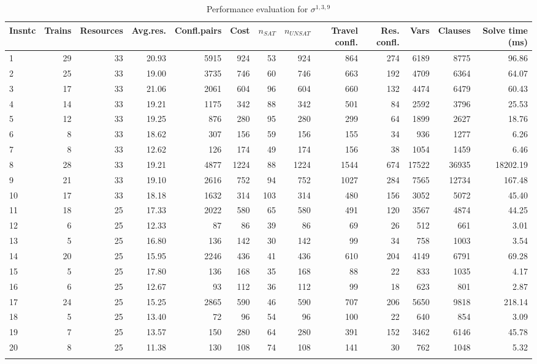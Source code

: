      \begin{landscape}
      \begin{longtable}[]{@{}lrrrrrrrrrrrr@{}}
      Insntc & Trains & Resources & Avg.res. & Confl.pairs & Cost & $n_{SAT}$ & $n_{UNSAT}$ & Travel confl. & Res. confl. & Vars & Clauses & Solve time (ms) \tabularnewline
      \midrule
      \endhead
      1&29&33&20.93&5915&924&53&924&864&274&6189&8775&96.86 \\
      2&25&33&19.00&3735&746&60&746&663&192&4709&6364&64.07 \\
      3&17&33&21.06&2061&604&96&604&660&132&4474&6479&60.43 \\
      4&14&33&19.21&1175&342&88&342&501&84&2592&3796&25.53 \\
      5&12&33&19.25&876&280&95&280&299&64&1899&2627&18.76 \\
      6&8&33&18.62&307&156&59&156&155&34&936&1277&6.26 \\
      7&8&33&12.62&126&174&49&174&156&38&1054&1459&6.46 \\
      8&28&33&19.21&4877&1224&88&1224&1544&674&17522&36935&18202.19 \\
      9&21&33&19.10&2616&752&94&752&1027&284&7565&12734&167.48 \\
      10&17&33&18.18&1632&314&103&314&480&156&3052&5072&45.40 \\
      11&18&25&17.33&2022&580&65&580&491&120&3567&4874&44.25 \\
      12&6&25&12.33&87&86&39&86&69&26&512&661&3.01 \\
      13&5&25&16.80&136&142&30&142&99&34&758&1003&3.54 \\
      14&20&25&15.95&2246&436&41&436&610&204&4149&6791&69.28 \\
      15&5&25&17.80&136&168&35&168&88&22&833&1035&4.17 \\
      16&6&25&12.67&93&112&36&112&99&18&623&801&2.87 \\
      17&24&25&15.25&2865&590&46&590&707&206&5650&9818&218.14 \\
      18&5&25&13.40&72&96&54&96&100&22&640&854&3.09 \\
      19&7&25&13.57&150&280&64&280&391&152&3462&6146&45.78 \\
      20&8&25&11.38&130&108&74&108&141&30&762&1048&5.32 \\
      \caption{Performance evaluation for \Large{$\sigma^{1,3,9}$}}    
      \end{longtable}
       \end{landscape}